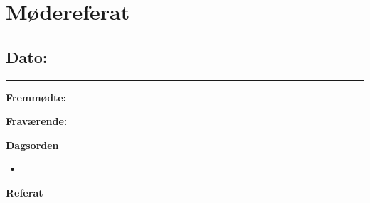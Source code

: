\chapter{Mødereferat}

\section{Dato: }
\hrule

\textbf{Fremmødte:} 

\textbf{Fraværende:} 

\textbf{Dagsorden}
\\
\begin{itemize}
	\item 
\end{itemize}

\textbf{Referat}
